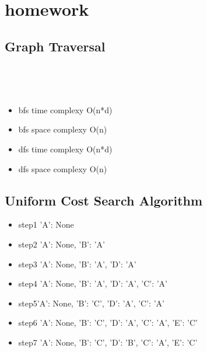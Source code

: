 \documentclass[aps,letterpaper,10pt]{revtex4}
\begin{document}


\section{homework}
\subsection{Graph Traversal}
	\begin{figure}[H]
		\centering
			   \\
	\end{figure}
	\begin{figure}[H]
		\centering
	 \\
	
	
\end{figure}
\begin{itemize}
\item bfs time complexy O(n*d)
\item bfs space complexy O(n)
\item dfs time complexy O(n*d)
\item dfs space complexy O(n)
\end{itemize}
\subsection{Uniform Cost Search Algorithm}
\begin{itemize}
\item step1 {'A': None}	 \newline [(0, 'A')]
\item step2 {'A': None, 'B': 'A'} \newline [(10, 'B')]
\item step3 {'A': None, 'B': 'A', 'D': 'A'} \newline [(10, 'B'), (20, 'D')]
\item step4 {'A': None, 'B': 'A', 'D': 'A', 'C': 'A'} \newline [(3, 'C'), (20, 'D'), (10, 'B')]
\item step5{'A': None, 'B': 'C', 'D': 'A', 'C': 'A'} \newline [(5, 'B'), (20, 'D'), (10, 'B')]
\item step6 {'A': None, 'B': 'C', 'D': 'A', 'C': 'A', 'E': 'C'} \newline[(5, 'B'), (18, 'E'), (10, 'B'), (20, 'D')]
\item step7 {'A': None, 'B': 'C', 'D': 'B', 'C': 'A', 'E': 'C'}\newline[(10, 'B'), (10, 'D'), (20, 'D'), (18, 'E')]

\end{itemize}
\end{document}
